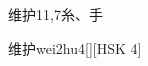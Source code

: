 \begin{entry}{维护}{11,7}{⽷、⼿}
  \begin{phonetics}{维护}{wei2hu4}[][HSK 4]
  \end{phonetics}
\end{entry}
